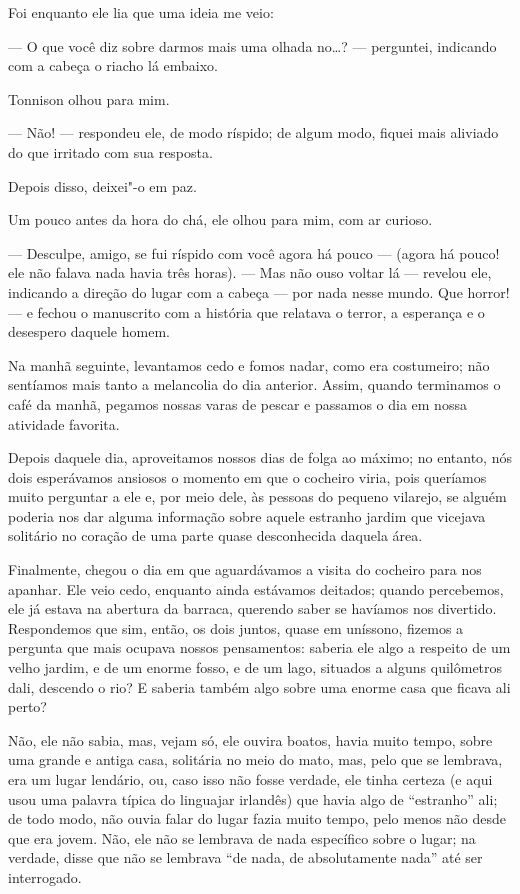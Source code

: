 Foi enquanto ele lia que uma ideia me veio:

--- O que você diz sobre darmos mais uma olhada no\ldots{}? --- perguntei, indicando com a cabeça o riacho lá embaixo.

Tonnison olhou para mim. 

--- Não! --- respondeu ele, de modo ríspido; de algum modo, fiquei mais
aliviado do que irritado com sua resposta.

Depois disso, deixei"-o em paz.

Um pouco antes da hora do chá, ele olhou para mim, com ar curioso.

--- Desculpe, amigo, se fui ríspido com você agora há pouco --- (agora há pouco! ele não falava nada havia três
horas). --- Mas não ouso voltar lá --- revelou ele, indicando a direção do lugar com a cabeça --- por nada nesse mundo. Que
horror! --- e fechou o manuscrito com a história que relatava o terror, a esperança e o desespero daquele homem.

Na manhã seguinte, levantamos cedo e fomos nadar, como era costumeiro; não sentíamos mais tanto a melancolia do dia
anterior. Assim, quando terminamos o café da manhã, pegamos nossas varas de pescar e passamos o dia em nossa
atividade favorita.

Depois daquele dia, aproveitamos nossos dias de folga ao máximo; no entanto, nós dois esperávamos ansiosos o momento
em que o cocheiro viria, pois queríamos muito perguntar a ele e, por meio dele, às pessoas do pequeno vilarejo, se
alguém poderia nos dar alguma informação sobre aquele estranho jardim que vicejava solitário no coração de uma parte
quase desconhecida daquela área.

Finalmente, chegou o dia em que aguardávamos a visita do cocheiro para nos apanhar. Ele veio cedo, enquanto ainda
estávamos deitados; quando percebemos, ele já estava na abertura da barraca, querendo saber se havíamos nos
divertido. Respondemos que sim, então, os dois juntos, quase em uníssono, fizemos a pergunta que mais ocupava nossos
pensamentos: saberia ele algo a respeito de um velho jardim, e de um enorme fosso, e de um lago, situados a alguns
quilômetros dali, descendo o rio? E saberia também algo sobre uma enorme casa que ficava ali perto?

Não, ele não sabia, mas, vejam só, ele ouvira boatos, havia muito tempo, sobre uma grande e antiga casa, solitária no meio
do mato, mas, pelo que se lembrava, era um lugar lendário, ou, caso isso não fosse verdade, ele tinha certeza (e aqui
usou uma palavra típica do linguajar irlandês) que havia algo de “estranho” ali; de todo modo, não ouvia falar do lugar
fazia muito tempo, pelo menos não desde que era jovem. Não, ele não se lembrava de nada específico sobre o lugar; na
verdade, disse que não se lembrava “de nada, de absolutamente nada” até ser interrogado.

